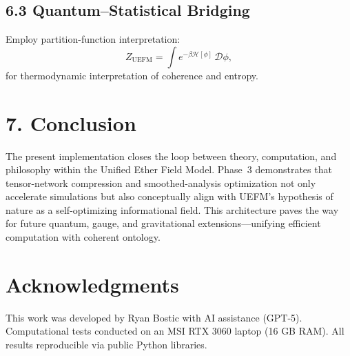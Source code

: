 \documentclass[11pt]{article}
\begin{document}
\subsection*{6.3 Quantum–Statistical Bridging}
Employ partition-function interpretation:
\[
Z_{\mathrm{UEFM}} = \int e^{-\beta \mathcal{H}[\phi]} \, \mathcal{D}\phi,
\]
for thermodynamic interpretation of coherence and entropy.

\section{7. Conclusion}

The present implementation closes the loop between theory, computation, and philosophy within the Unified Ether Field Model. Phase~3 demonstrates that tensor-network compression and smoothed-analysis optimization not only accelerate simulations but also conceptually align with UEFM’s hypothesis of nature as a self-optimizing informational field. This architecture paves the way for future quantum, gauge, and gravitational extensions—unifying efficient computation with coherent ontology.

\section*{Acknowledgments}

This work was developed by Ryan Bostic with AI assistance (GPT-5). Computational tests conducted on an MSI RTX 3060 laptop (16 GB RAM). All results reproducible via public Python libraries.



\end{document}

